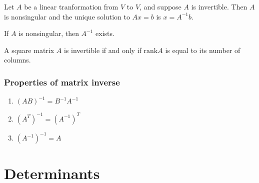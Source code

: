 \documentclass[compress]{beamer}
\newcommand{\rank}{\mathrm{rank}}
\begin{document}
\begin{frame}
  \begin{lemma}
    Let $A$ be a linear tranformation from $V$ to $V$, and suppose $A$
    is invertible. Then $A$ is nonsingular and the unique solution to
    $Ax = b$ is $x = A^{-1} b$. 
  \end{lemma}

  \begin{lemma}
    If $A$ is nonsingular, then $A^{-1}$ exists.
  \end{lemma}

  \begin{corollary}
    A square matrix $A$ is invertible if and only if $\rank A$ is
    equal to its number of columns.
  \end{corollary}
\end{frame}

\begin{frame}
  \frametitle{Properties of matrix inverse}
  \begin{enumerate}
  \item $(AB)^{-1} = B^{-1} A^{-1}$
  \item $(A^T)^{-1} = (A^{-1})^T$
  \item $(A^{-1})^{-1} = A$
  \end{enumerate}
\end{frame}

\section{Determinants}
\end{document}
